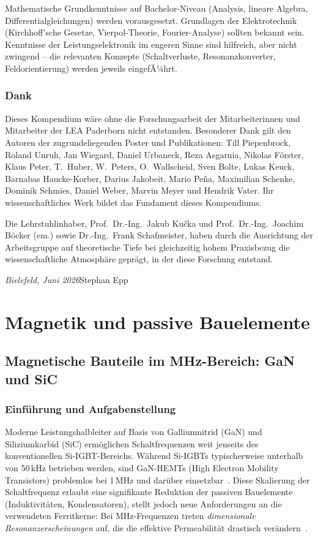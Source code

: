 ﻿\documentclass[a4paper,12pt,openany,oneside]{book}
\newcommand{\abschnitt}[1]{\section{#1}}
\theoremstyle{definition}
\begin{document}
Mathematische Grundkenntnisse auf Bachelor-Niveau (Analysis, lineare Algebra,
Differentialgleichungen) werden vorausgesetzt. Grundlagen der Elektrotechnik
(Kirchhoff'sche Gesetze, Vierpol-Theorie, Fourier-Analyse) sollten bekannt sein.
Kenntnisse der Leistungselektronik im engeren Sinne sind hilfreich, aber nicht
zwingend -- die relevanten Konzepte (Schaltverluste, Resonanzkonverter, Feldorientierung)
werden jeweils eingefÃ¼hrt.

\abschnitt{Dank}

Dieses Kompendium w\"are ohne die Forschungsarbeit der Mitarbeiterinnen und Mitarbeiter
der LEA Paderborn nicht entstanden. Besonderer Dank gilt den Autoren der zugrundeliegenden
Poster und Publikationen: Till Piepenbrock, Roland Unruh, Jan Wiegard, Daniel Urbaneck,
Reza Asgarnia, Nikolas F\"orster, Klaus Peter, T.~Huber, W.~Peters, O.~Wallscheid,
Sven Bolte, Lukas Keuck, Barnabas Haucke-Korber, Darius Jakobeit, Mario Pe\~na,
Maximilian Schenke, Dominik Schmies, Daniel Weber, Marvin Meyer und Hendrik Vater.
Ihr wissenschaftliches Werk bildet das Fundament dieses Kompendiums.

Die Lehrstuhlinhaber, Prof.\ Dr.-Ing.\ Jakub Ku\v{c}ka und Prof.\ Dr.-Ing.\ Joachim
B\"ocker (em.) sowie Dr.-Ing.\ Frank Schafmeister, haben durch die Ausrichtung der
Arbeitsgruppe auf theoretische Tiefe bei gleichzeitig hohem Praxisbezug die
wissenschaftliche Atmosph\"are gepr\"agt, in der diese Forschung entstand.

\medskip\noindent
\textit{Bielefeld, Juni 2026}\hfill Stephan Epp


\part{Magnetik und passive Bauelemente}

\chapter{Magnetische Bauteile im MHz-Bereich: GaN und SiC}
\label{kap:mhz_magnetik}

\abschnitt{Einf\"uhrung und Aufgabenstellung}

Moderne Leistungshalbleiter auf Basis von Galliumnitrid (GaN) und Siliziumkarbid (SiC) erm\"oglichen
Schaltfrequenzen weit jenseits des konventionellen Si-IGBT-Bereichs. W\"ahrend Si-IGBTs
typischerweise unterhalb von 50\,kHz betrieben werden, sind GaN-HEMTs (High Electron Mobility
Transistors) problemlos bei 1\,MHz und dar\"uber einsetzbar~\cite{jones2020gan}. Diese
Skalierung der Schaltfrequenz erlaubt eine signifikante Reduktion der passiven Bauelemente
(Induktivit\"aten, Kondensatoren), stellt jedoch neue Anforderungen an die verwendeten
Ferritkerne: Bei MHz-Frequenzen treten \emph{dimensionale Resonanzerscheinungen} auf,
die die effektive Permeabilit\"at drastisch ver\"andern~\cite{Dixon2001, Muhlethaler2012}.
\end{document}
